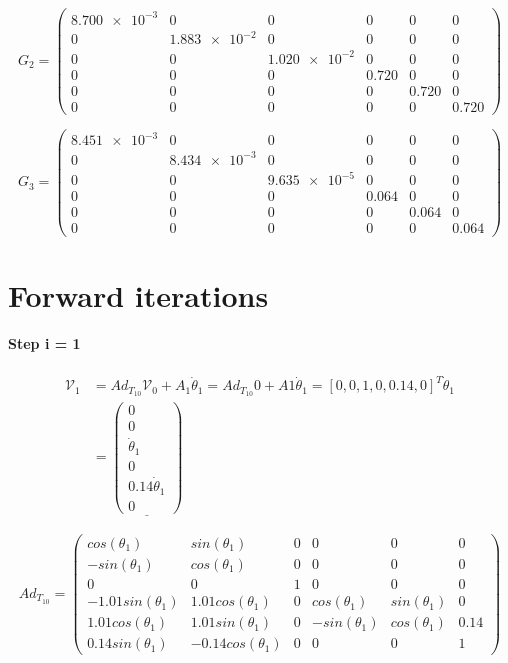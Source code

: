 \documentclass[]{scrreprt}
\newcommand{\myvec}[1]{\left(\begin{array}{c}#1\end{array}\right)}
\begin{document}
\[
G_2 = 
\left(
\begin{array}{ccccccc}
\num{+8.700e-3} & \num{0} & \num{0} & 0 & 0 & 0\\
\num{0} & \num{+1.883e-2} & \num{0} & 0 & 0 & 0\\
\num{0} & \num{0} & \num{+1.020e-2} & 0 & 0 & 0\\
0 & 0 & 0 & 0.720 & 0 & 0\\
0 & 0 & 0 & 0 & 0.720 & 0\\
0 & 0 & 0 & 0 & 0 & 0.720
\end{array}
\right)
\]

\[
G_3 = 
\left(
\begin{array}{cccccc}
\num{+8.451e-3} & \num{0} & \num{0} & 0 & 0 & 0\\
\num{0} & \num{+8.434e-3} & \num{0} & 0 & 0 & 0\\
\num{0} & \num{0} & \num{+9.635e-5} & 0 & 0 & 0\\
0 & 0 & 0 & 0.064 & 0 & 0\\
0 & 0 & 0 & 0 & 0.064 & 0\\
0 & 0 & 0 & 0 & 0 & 0.064
\end{array}
\right)
\]

\section{Forward iterations}

\paragraph{Step i = 1}

\begin{align*}
\mathcal{V}_1 &= Ad_{T_{10}}\mathcal{V}_0 + A_1\dot{\theta}_1
= Ad_{T_10}0 + A1\dot{\theta}_1
= [0,0,1,0,0.14,0]^T\dot{\theta}_1\\
&= \underline{\myvec{0\\0\\\dot{\theta}_1\\0\\0.14\dot{\theta}_1\\0}}
\end{align*}         

\[
Ad_{T_{10}} = \left(\begin{array}{cccccc}
cos(\theta_1) & sin(\theta_1) & 0 & 0 & 0 & 0\\
-sin(\theta_1) & cos(\theta_1) & 0 & 0 & 0 & 0\\
0 & 0 & 1 & 0 & 0 & 0\\
-1.01sin(\theta_1) & 1.01cos(\theta_1) & 0 & cos(\theta_1) & sin(\theta_1) & 0\\
1.01cos(\theta_1) & 1.01sin(\theta_1) & 0 & -sin(\theta_1) & cos(\theta_1) & 0.14\\
0.14sin(\theta_1) & -0.14cos(\theta_1) & 0 & 0 & 0 & 1
\end{array}
\right)
\]
\end{document}
